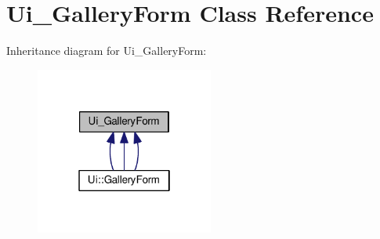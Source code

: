 \hypertarget{class_ui___gallery_form}{}\section{Ui\+\_\+\+Gallery\+Form Class Reference}
\label{class_ui___gallery_form}


Inheritance diagram for Ui\+\_\+\+Gallery\+Form\+:
\nopagebreak
\begin{figure}[H]
\begin{center}
\leavevmode
\includegraphics[width=166pt]{class_ui___gallery_form__inherit__graph}
\end{center}
\end{figure}
